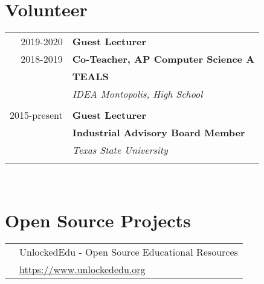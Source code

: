 \documentclass[10pt]{article} %
\begin{document}
\begin{minipage}[t]{0.44\textwidth}
\begin{tabular}{rl}
\end{tabular}\\


\section{Volunteer} 

\begin{tabular}{rl}
2019-2020     & \textbf{Guest Lecturer}\\
2018-2019     & \textbf{Co-Teacher, AP Computer Science A}\\
& \textbf{TEALS}\\
& \textit{IDEA Montopolis, High School}\\ \\

2015-present & \textbf{Guest Lecturer}\\
& \textbf{Industrial Advisory Board Member}\\
& \textit{Texas State University}\\\\

\end{tabular}\\

\section{Open Source Projects}

\begin{tabular}{rl}
& UnlockedEdu - Open Source Educational Resources\\
& \quad \href{https://www.unlockededu.org}{https://www.unlockededu.org} \\
\end{tabular}\\


	
\end{minipage} %
\end{document}
